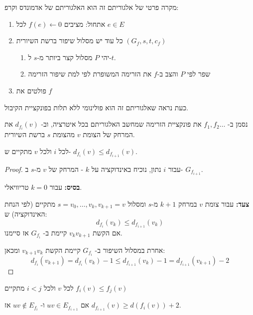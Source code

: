 מקרה פרטי של אלגוריתם זה הוא האלגוריתם של אדמונדס וקרפ:

\begin{enumerate}
\item
אתחול: מציבים 
$f(e) \leftarrow 0$
לכל
$e \in E$

\item
כל עוד יש מסלול שיפור ברשת השיורית
$(G_f, s, t, c_f)$
\begin{enumerate}
\item
יהי $P$ מסלול קצר ביותר מ-$s$ ל-$t$.
\item
שפר לפי $P$ והצב ב-$f$ את הזרימה המשופרת לפי למת שיפור הזרימה
\end{enumerate}
\item
פולטים את $f$
\end{enumerate}


כעת נראה שאלגוריתם זה הוא פולינומי ללא תלות בפונקציית הקיבול.

נסמן ב-%
$f_1, f_2 \ldots $
את פונקציית הזרימה שמחשב האלגוריתם בכל איטרציה, וב-%
$d_{f_i}(v)$
את המרחק של הצומת $v$ מהצומת $s$ ברשת השיורית.

\begin{claim}
לכל $i$ ולכל $v$ מתקיים ש-%
$d_{f_i}(v) \leq d_{f_{i+1}}(v)$.
\end{claim}

\begin{proof}
עבור $i$ נתון, נוכיח באינדוקציה על $k$ - המרחק של $v$ מ-$s$ ב-%
$G_{f_{i + 1}}$.

\textbf{בסיס:}
עבור 
$k=0$
טריוויאלי.

\textbf{צעד:}
עבור צומת $v$ במרחק 
$k + 1$ 
מ-$s$ ומסלול
$s = v_0, \ldots, v_k, v_{k + 1} = v$
מתקיים (לפי הנחת האינדוקציה) ש:
$$d_{f_i}(v_k) \leq d_{f_{i + 1}}(v_k)$$
אם הקשת 
$v_k v_{k + 1}$
קיימת ב-%
$G_{f_i}$
אז סיימנו.

אחרת במסלול השיפור ב-%
$G_{f_i}$
קיימת הקשת 
$v_{k+1}v_k$
ומכאן:
$$
d_{f_i}(v_{k + 1}) =
d_{f_i}(v_{k}) - 1 \leq 
d_{f_{i + 1}}(v_{k}) - 1 =
d_{f_{i + 1}}(v_{k + 1}) - 2
$$
\end{proof}

\begin{corollary}
לכל $v$ ולכל
$i < j$
מתקיים
$f_i(v) \leq f_j(v)$

\end{corollary}

\begin{corollary}
אם
$uv \in E_{f_{i + 1}}$
ו-%
$uv \notin E_{f_{i}}$
אז
$d_{f_{i + 1}}(v) \geq d(f_{i}(v)) + 2$.
\end{corollary}

